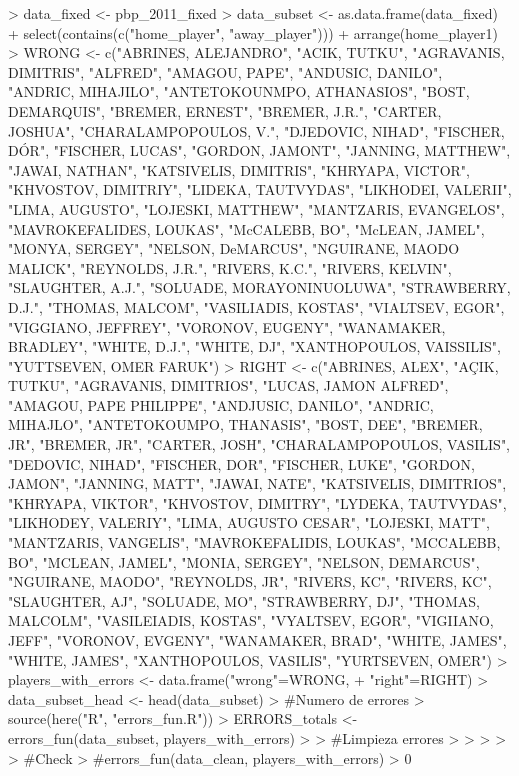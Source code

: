 \documentclass[paper=a4, fontsize=9pt]{article}
\begin{document}
\begin{Schunk}
\begin{Sinput}
> data_fixed <- pbp_2011_fixed
> data_subset <- as.data.frame(data_fixed) %
+   select(contains(c("home_player", "away_player"))) %
+   arrange(home_player1)
> WRONG <- c("ABRINES, ALEJANDRO", "ACIK, TUTKU", "AGRAVANIS, DIMITRIS", "ALFRED", "AMAGOU, PAPE", "ANDUSIC, DANILO", "ANDRIC, MIHAJILO", "ANTETOKOUNMPO, ATHANASIOS", "BOST, DEMARQUIS", "BREMER, ERNEST", "BREMER, J.R.", "CARTER, JOSHUA", "CHARALAMPOPOULOS, V.", "DJEDOVIC, NIHAD", "FISCHER, D\'OR", "FISCHER, LUCAS", "GORDON, JAMONT", "JANNING, MATTHEW",  "JAWAI, NATHAN", "KATSIVELIS, DIMITRIS", "KHRYAPA, VICTOR", "KHVOSTOV, DIMITRIY", "LIDEKA, TAUTVYDAS", "LIKHODEI, VALERII", "LIMA, AUGUSTO", "LOJESKI, MATTHEW", "MANTZARIS, EVANGELOS", "MAVROKEFALIDES, LOUKAS", "McCALEBB, BO", "McLEAN, JAMEL", "MONYA, SERGEY", "NELSON, DeMARCUS", "NGUIRANE, MAODO MALICK", "REYNOLDS, J.R.", "RIVERS, K.C.", "RIVERS, KELVIN", "SLAUGHTER, A.J.", "SOLUADE, MORAYONINUOLUWA", "STRAWBERRY, D.J.", "THOMAS, MALCOM", "VASILIADIS, KOSTAS", "VIALTSEV, EGOR", "VIGGIANO, JEFFREY", "VORONOV, EUGENY", "WANAMAKER, BRADLEY", "WHITE, D.J.", "WHITE, DJ", "XANTHOPOULOS, VAISSILIS", "YUTTSEVEN, OMER FARUK")
> RIGHT <- c("ABRINES, ALEX", "AÇIK, TUTKU", "AGRAVANIS, DIMITRIOS", "LUCAS, JAMON ALFRED", "AMAGOU, PAPE PHILIPPE", "ANDJUSIC, DANILO", "ANDRIC, MIHAJLO", "ANTETOKOUMPO, THANASIS", "BOST, DEE", "BREMER, JR", "BREMER, JR", "CARTER, JOSH", "CHARALAMPOPOULOS, VASILIS", "DEDOVIC, NIHAD", "FISCHER, DOR", "FISCHER, LUKE", "GORDON, JAMON", "JANNING, MATT", "JAWAI, NATE", "KATSIVELIS, DIMITRIOS", "KHRYAPA, VIKTOR", "KHVOSTOV, DIMITRY", "LYDEKA, TAUTVYDAS", "LIKHODEY, VALERIY", "LIMA, AUGUSTO CESAR", "LOJESKI, MATT", "MANTZARIS, VANGELIS", "MAVROKEFALIDIS, LOUKAS", "MCCALEBB, BO", "MCLEAN, JAMEL", "MONIA, SERGEY", "NELSON, DEMARCUS", "NGUIRANE, MAODO", "REYNOLDS, JR", "RIVERS, KC", "RIVERS, KC", "SLAUGHTER, AJ", "SOLUADE, MO", "STRAWBERRY, DJ", "THOMAS, MALCOLM", "VASILEIADIS, KOSTAS", "VYALTSEV, EGOR", "VIGIIANO, JEFF", "VORONOV, EVGENY", "WANAMAKER, BRAD", "WHITE, JAMES", "WHITE, JAMES", "XANTHOPOULOS, VASILIS", "YURTSEVEN, OMER")
> players_with_errors <- data.frame("wrong"=WRONG, 
+                                   "right"=RIGHT)
> data_subset_head <- head(data_subset)
> #Numero de errores
> source(here("R", "errors_fun.R"))
> ERRORS_totals <- errors_fun(data_subset, players_with_errors)
> 
> #Limpieza errores
> 
> 
> 
> 
> #Check
> #errors_fun(data_clean, players_with_errors) > 0
\end{Sinput}
\end{Schunk}
\end{document}
